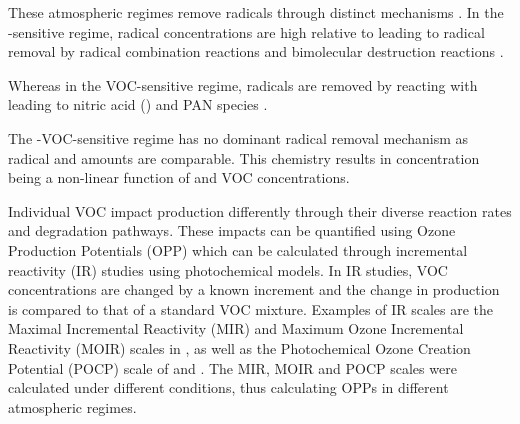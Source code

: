 These atmospheric regimes remove radicals through distinct mechanisms \citep{Kleinman:1991}. 
In the -sensitive regime, radical concentrations are high relative to  leading to radical removal by radical combination reactions  and bimolecular destruction reactions  \citep{Kleinman:1994}.
\vspace{-5mm}
\begin{reactionlist}
\end{reactionlist}
Whereas in the VOC-sensitive regime, radicals are removed by reacting with  leading to nitric acid ()  and PAN species .
\vspace{-3mm}
\begin{reactionlist}
\end{reactionlist}
The -VOC-sensitive regime has no dominant radical removal mechanism as radical and  amounts are comparable.
This chemistry results in  concentration being a non-linear function of  and VOC concentrations.

Individual VOC impact  production differently through their diverse reaction rates and degradation pathways. 
These impacts can be quantified using Ozone Production Potentials (OPP) which can be calculated through incremental reactivity (IR) studies using photochemical models. 
In IR studies, VOC concentrations are changed by a known increment and the change in  production is compared to that of a standard VOC mixture. 
Examples of IR scales are the Maximal Incremental Reactivity (MIR) and Maximum Ozone Incremental Reactivity (MOIR) scales in \citet{Carter:1994}, as well as the Photochemical Ozone Creation Potential (POCP) scale of \citet{Derwent:1996} and \citet{Derwent:1998}. 
The MIR, MOIR and POCP scales were calculated under different  conditions, thus calculating OPPs in different atmospheric regimes.

